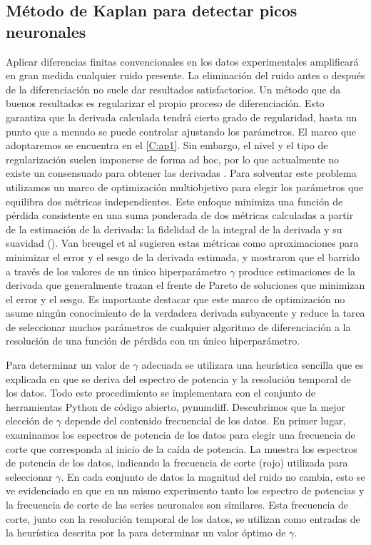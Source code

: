   
\subsection{Método de Kaplan  para detectar picos neuronales}

Aplicar diferencias finitas convencionales en los datos experimentales amplificará en gran medida cualquier ruido presente. La eliminación del ruido antes o después de la diferenciación no suele dar resultados satisfactorios. Un método que da buenos resultados es regularizar el propio proceso de diferenciación. Esto garantiza que la derivada calculada tendrá cierto grado de regularidad, hasta un punto que a menudo se puede controlar ajustando los parámetros. El marco que adoptaremos se encuentra en el \cref{C:ap1}. Sin embargo, el nivel y el tipo de regularización suelen imponerse de forma ad hoc, por lo que actualmente no existe un  consensuado para obtener las derivadas . Para solventar este problema utilizamos un marco de optimización multiobjetivo para elegir los parámetros que equilibra dos métricas independientes.  Este enfoque minimiza una función de pérdida consistente en una suma ponderada de dos métricas calculadas a partir de la estimación de la derivada: la fidelidad de la integral de la derivada y su suavidad (). Van breugel et al \cite{van_breugel_numerical_2020} sugieren estas métricas como aproximaciones para minimizar el error y el sesgo de la derivada estimada, y mostraron  que el barrido a través de los valores de un único hiperparámetro $\gamma$ produce estimaciones de la derivada que generalmente trazan el frente de Pareto de soluciones que minimizan el error y el sesgo. Es importante destacar que este marco de optimización no asume ningún conocimiento de la verdadera derivada subyacente y reduce la tarea de seleccionar muchos parámetros de cualquier algoritmo de diferenciación a la resolución de una función de pérdida con un único hiperparámetro. 

Para determinar un valor de $\gamma$  adecuada se utilizara  una heurística sencilla que es explicada en \cite{van_breugel_numerical_2020}  que se deriva del espectro de potencia y la resolución temporal de los datos. Todo este procedimiento se implementara  con el conjunto de herramientas Python de código abierto, pynumdiff.  Descubrimos que la mejor elección de $\gamma$ depende del contenido frecuencial de los datos.   En primer lugar, examinamos los espectros de potencia de los datos para elegir una frecuencia de corte que corresponda al inicio de la caída de potencia.  La  muestra los espectros de potencia de los datos, indicando la frecuencia de corte (rojo) utilizada para seleccionar $\gamma$.  En cada conjunto de datos  la magnitud del ruido no cambia, esto se ve evidenciado  en que en un mismo experimento tanto los  espectro de potencias y la frecuencia de corte de las series neuronales son similares.  Esta frecuencia de corte, junto con la resolución temporal de los datos, se utilizan como entradas de la  heurística descrita por la  para determinar un valor óptimo de $\gamma$.  


